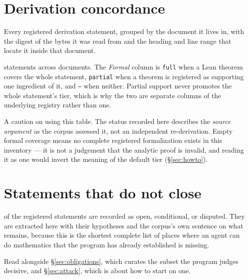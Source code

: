 \section{Derivation concordance}
\label{app:concordance}

Every registered derivation statement, grouped by the document it lives
in, with the digest of the bytes it was read from and the heading and
line range that locate it inside that document.

\DerivStatements{} statements across \CiteDocs{} documents. The
\emph{Formal} column is \texttt{full} when a Lean theorem covers the
whole statement, \texttt{partial} when a theorem is registered as
supporting one ingredient of it, and \texttt{---} when neither. Partial
support never promotes the whole statement's tier, which is why the
two are separate columns of the underlying registry rather than one.

A caution on using this table. The status recorded here describes the
\emph{source argument} as the corpus assessed it, not an independent
re-derivation. Empty formal coverage means no complete registered
formalization exists in this inventory --- it is not a judgement that
the analytic proof is invalid, and reading it as one would invert the
meaning of the default tier (\S\ref{sec:howto}).



\section{Statements that do not close}
\label{app:open}

\DerivOpen{} of the \DerivStatements{} registered statements are
recorded as open, conditional, or disputed. They are extracted here
with their hypotheses and the corpus's own sentence on what remains,
because this is the shortest complete list of places where an agent can
do mathematics that the program has already established is missing.

Read alongside \S\ref{sec:obligations}, which curates the subset the
program judges decisive, and \S\ref{sec:attack}, which is about how to
start on one.


